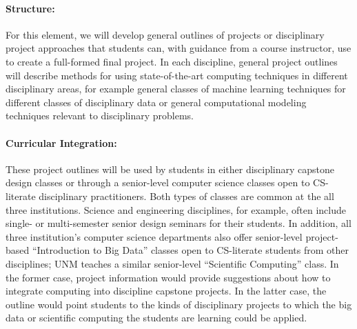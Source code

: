 \paragraph{Structure:} For this element, we will develop general outlines of projects or disciplinary project approaches that students can, with guidance from a course instructor, use to create a full-formed final project. In each discipline, general project outlines will describe methods for using state-of-the-art computing techniques in different disciplinary areas, for example general classes of machine learning techniques for different classes of disciplinary data or general computational modeling techniques relevant to disciplinary problems.

\paragraph{Curricular Integration:}
These project outlines will be used by students in either disciplinary capstone design classes or through a senior-level computer science classes open to CS-literate disciplinary practitioners. Both types of classes are common at the all three institutions. Science and engineering disciplines, for example, often include single- or multi-semester senior design seminars for their students. In addition, all three institution's computer science departments also offer senior-level project-based ``Introduction to Big Data'' classes open to CS-literate students from other disciplines; UNM  teaches a similar senior-level ``Scientific Computing'' class. In the former case, project information would provide suggestions about how to integrate computing into discipline capstone projects. In the latter case, the outline would point students to the kinds of disciplinary projects to which the big data or scientific computing the students are learning could be applied.



